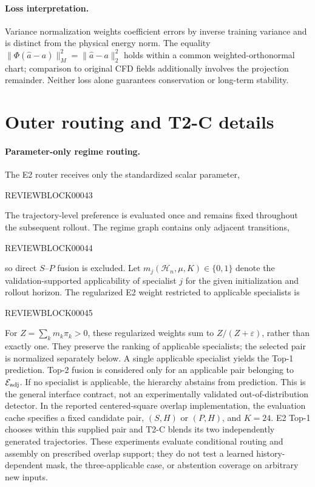 \documentclass{article}
\begin{document}
\paragraph{Loss interpretation.}
Variance normalization weights coefficient errors by inverse training
variance and is distinct from the physical energy norm. The equality
$\|\Phi(\widehat a-a)\|_M^2=\|\widehat a-a\|_2^2$ holds within a common
weighted-orthonormal chart; comparison to original CFD fields additionally
involves the projection remainder. Neither loss alone guarantees
conservation or long-term stability.

\section{Outer routing and T2-C details}
\label{app:routing}

\paragraph{Parameter-only regime routing.}
The E2 router receives only the standardized scalar parameter,


REVIEWBLOCK00043


The trajectory-level preference is evaluated once and remains fixed
throughout the subsequent rollout. The regime graph contains only adjacent transitions,


REVIEWBLOCK00044


so direct $S$--$P$ fusion is excluded.
Let
$m_j(\mathcal H_n,\mu,K)\in\{0,1\}$
denote the validation-supported applicability of specialist $j$ for the
given initialization and rollout horizon.
The regularized E2 weight restricted to applicable specialists is


REVIEWBLOCK00045


For $Z=\sum_k m_k\pi_k>0$, these regularized weights sum to $Z/(Z+\varepsilon)$, rather than exactly one. They preserve the ranking of applicable specialists; the selected pair is normalized separately below. A single applicable specialist yields the Top-1 prediction.
Top-2 fusion is considered only for an applicable pair belonging to
$\mathcal E_{\rm adj}$.
If no specialist is applicable, the hierarchy abstains from prediction. This is the general interface contract, not an experimentally validated out-of-distribution detector. In the reported centered-square overlap implementation, the evaluation cache specifies a fixed candidate pair, $(S,H)$ or $(P,H)$, and $K=24$. E2 Top-1 chooses within this supplied pair and T2-C blends its two independently generated trajectories. These experiments evaluate conditional routing and assembly on prescribed overlap support; they do not test a learned history-dependent mask, the three-applicable case, or abstention coverage on arbitrary new inputs.
\end{document}

